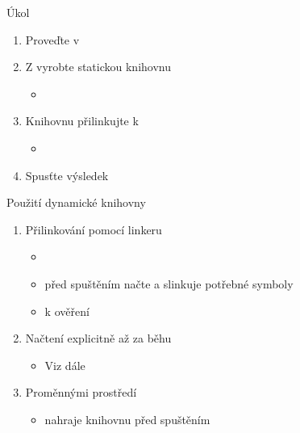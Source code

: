 \iffimuni
\begin{frame}{Úkol}

  \begin{enumerate}
    \item Proveďte  v 

    \item Z  vyrobte statickou knihovnu 
    \begin{itemize}
      \item {}
    \end{itemize}

    \item Knihovnu přilinkujte k 
    \begin{itemize}
      \item {}
    \end{itemize}

    \item Spusťte výsledek
  \end{enumerate}

\end{frame}
\fi

\begin{frame}{Použití dynamické knihovny}

  \begin{enumerate}
    \item Přilinkování pomocí linkeru
    \begin{itemize}
      \item {}
      \item {} před spuštěním načte a slinkuje potřebné symboly

      \pause

      \item {}  k ověření
    \end{itemize}

    \pause

    \item Načtení explicitně až za běhu
    \begin{itemize}
      \item Viz dále
    \end{itemize}

    \pause

    \item Proměnnými prostředí
    \begin{itemize}
      \item {} nahraje knihovnu před spuštěním
    \end{itemize}
  \end{enumerate}

\end{frame}

